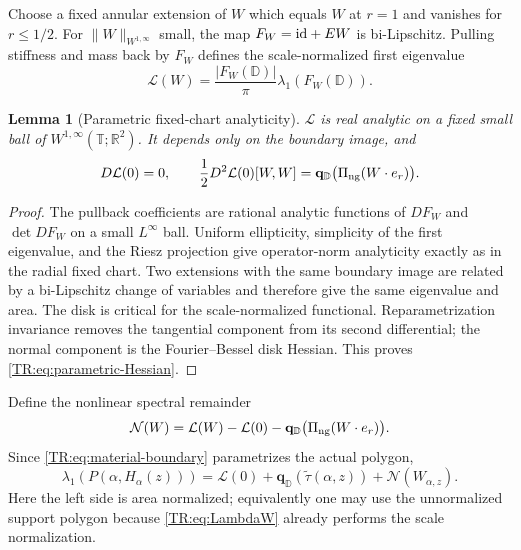 \documentclass[11pt]{amsart}
\numberwithin{equation}{section}
\newtheorem{lemma}[theorem]{Lemma}
\theoremstyle{definition}
\theoremstyle{remark}
\newcommand{\T}{\mathbb T}
\newcommand{\PiNG}{\Pi_{\rm ng}}
\newcommand{\qphys}{\mathbf q_{\mathbb D}}
\begin{document}
Choose a fixed annular extension of $W$ which equals $W$ at $r=1$ and
vanishes for $r\le1/2$.  For $\|W\|_{W^{1,\infty}}$ small, the map
$F_W={\rm id}+EW$ is bi-Lipschitz.  Pulling stiffness and mass back by
$F_W$ defines the scale-normalized first eigenvalue
\begin{equation}\label{TR:eq:LambdaW}
 \mathcal L(W)=\frac{|F_W(\mathbb D)|}{\pi}
 \lambda_1(F_W(\mathbb D)).
\end{equation}

\begin{lemma}[Parametric fixed-chart analyticity]
\label{TR:lem:parametric-analytic}
$\mathcal L$ is real analytic on a fixed small ball of
$W^{1,\infty}(\T;\mathbb R^2)$.  It depends only on the boundary image,
and
\begin{equation}\label{TR:eq:parametric-Hessian}
 D\mathcal L(0)=0,
 \qquad
 \frac12D^2\mathcal L(0)[W,W]
 =\qphys\bigl(\PiNG(W\cdot e_r)\bigr).
\end{equation}
\end{lemma}

\begin{proof}
The pullback coefficients are rational analytic functions of $DF_W$ and
$\det DF_W$ on a small $L^\infty$ ball.  Uniform ellipticity, simplicity
of the first eigenvalue, and the Riesz projection give operator-norm
analyticity exactly as in the radial fixed chart.  Two extensions with the
same boundary image are related by a bi-Lipschitz change of variables and
therefore give the same eigenvalue and area.  The disk is critical for the
scale-normalized functional.  Reparametrization invariance removes the
tangential component from its second differential; the normal component
is the Fourier--Bessel disk Hessian.  This proves
\eqref{TR:eq:parametric-Hessian}.
\end{proof}

Define the nonlinear spectral remainder
\begin{equation}\label{TR:eq:N}
 \mathcal N(W)=\mathcal L(W)-\mathcal L(0)
 -\qphys\bigl(\PiNG(W\cdot e_r)\bigr).
\end{equation}
Since \eqref{TR:eq:material-boundary} parametrizes the actual polygon,
\begin{equation}\label{TR:eq:exact-value-split}
 \boxed{
 \lambda_1(P(\alpha,H_\alpha(z)))
 =\mathcal L(0)+\qphys(\widetilde\tau(\alpha,z))
  +\mathcal N(W_{\alpha,z}).}
\end{equation}
Here the left side is area normalized; equivalently one may use the
unnormalized support polygon because \eqref{TR:eq:LambdaW} already performs
the scale normalization.
\endgroup
\end{document}
